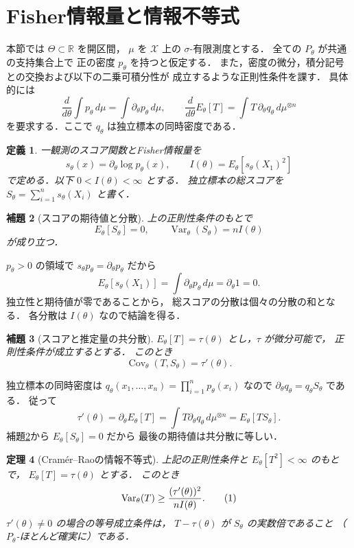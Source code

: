 \documentclass[a5paper,10pt,onecolumn]{jsarticle}
\makeatletter
\theoremstyle{mathnotetheorem}
\newtheorem{theorem}{定理}[section]
\newtheorem{definition}[theorem]{定義}
\newtheorem{lemma}[theorem]{補題}
\renewcommand{\proofname}{証明}
\renewenvironment{proof}[1][\proofname]{%
  \par\pushQED{\qed}\normalfont\topsep4\p@\@plus2\p@\relax
  \trivlist\item[\hskip\labelsep\bfseries #1]\ignorespaces
}{\popQED\endtrivlist\@endpefalse}
\makeatother
\begin{document}
\section{Fisher情報量と情報不等式}
本節では $\Theta\subset\mathbb R$ を開区間，
$\mu$ を $\mathcal X$ 上の $\sigma$-有限測度とする．
全ての $P_\theta$ が共通の支持集合上で
正の密度 $p_\theta$ を持つと仮定する．
また，密度の微分，積分記号との交換および以下の二乗可積分性が
成立するような正則性条件を課す．
具体的には
\[
 \frac d{d\theta}\int p_\theta\,d\mu
 =\int\partial_\theta p_\theta\,d\mu,\qquad
 \frac d{d\theta}E_\theta[T]
 =\int T\,\partial_\theta q_\theta\,d\mu^{\otimes n}
\]
を要求する．ここで $q_\theta$ は独立標本の同時密度である．
\begin{definition}
一観測のスコア関数とFisher情報量を
\[
 s_\theta(x)=\partial_\theta\log p_\theta(x),\qquad
 I(\theta)=E_\theta[s_\theta(X_1)^2]
\]
で定める．以下 $0<I(\theta)<\infty$ とする．
独立標本の総スコアを
$S_\theta=\sum_{i=1}^ns_\theta(X_i)$ と書く．
\end{definition}
\begin{lemma}[スコアの期待値と分散]\label{lem:score}
上の正則性条件のもとで
\[
 E_\theta[S_\theta]=0,\qquad
 \operatorname{Var}_\theta(S_\theta)=nI(\theta)
\]
が成り立つ．
\end{lemma}
\begin{proof}
$p_\theta>0$ の領域で
$s_\theta p_\theta=\partial_\theta p_\theta$ だから
\[
 E_\theta[s_\theta(X_1)]
 =\int\partial_\theta p_\theta\,d\mu
 =\partial_\theta1=0.
\]
独立性と期待値が零であることから，
総スコアの分散は個々の分散の和となる．
各分散は $I(\theta)$ なので結論を得る．
\end{proof}
\begin{lemma}[スコアと推定量の共分散]\label{lem:covscore}
$E_\theta[T]=\tau(\theta)$ とし，$\tau$ が微分可能で，
正則性条件が成立するとする．
このとき
\[
 \operatorname{Cov}_\theta(T,S_\theta)=\tau'(\theta).
\]
\end{lemma}
\begin{proof}
独立標本の同時密度は
$q_\theta(x_1,\ldots,x_n)=\prod_{i=1}^np_\theta(x_i)$ なので
$\partial_\theta q_\theta=q_\theta S_\theta$ である．
従って
\[
 \tau'(\theta)=\partial_\theta E_\theta[T]
 =\int T\partial_\theta q_\theta\,d\mu^{\otimes n}
 =E_\theta[TS_\theta].
\]
補題\ref{lem:score}から $E_\theta[S_\theta]=0$ だから
最後の期待値は共分散に等しい．
\end{proof}
\begin{theorem}[Cram\'er--Raoの情報不等式]\label{thm:cr}
上記の正則性条件と $E_\theta[T^2]<\infty$ のもとで，
$E_\theta[T]=\tau(\theta)$ とする．
このとき
\[
 \operatorname{Var}_\theta(T)
 \ge {(\tau'(\theta))^2\over nI(\theta)}.
 \tag{1}
\]
$\tau'(\theta)\ne0$ の場合の等号成立条件は，
$T-\tau(\theta)$ が $S_\theta$ の実数倍であること
（$P_\theta$-ほとんど確実に）である．
\end{theorem}
\end{document}
